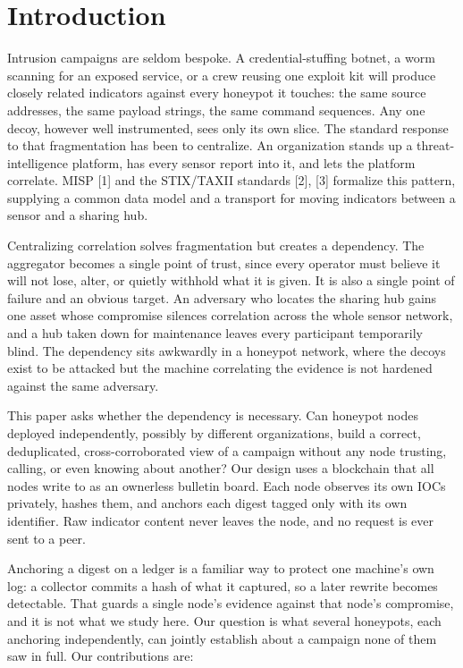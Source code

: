 \documentclass[conference]{IEEEtran}
\begin{document}
\section{Introduction}

Intrusion campaigns are seldom bespoke. A credential-stuffing botnet, a worm scanning for an exposed service, or a crew reusing one exploit kit will produce closely related indicators against every honeypot it touches: the same source addresses, the same payload strings, the same command sequences. Any one decoy, however well instrumented, sees only its own slice. The standard response to that fragmentation has been to centralize. An organization stands up a threat-intelligence platform, has every sensor report into it, and lets the platform correlate. MISP [1] and the STIX/TAXII standards [2], [3] formalize this pattern, supplying a common data model and a transport for moving indicators between a sensor and a sharing hub.

Centralizing correlation solves fragmentation but creates a dependency. The aggregator becomes a single point of trust, since every operator must believe it will not lose, alter, or quietly withhold what it is given. It is also a single point of failure and an obvious target. An adversary who locates the sharing hub gains one asset whose compromise silences correlation across the whole sensor network, and a hub taken down for maintenance leaves every participant temporarily blind. The dependency sits awkwardly in a honeypot network, where the decoys exist to be attacked but the machine correlating the evidence is not hardened against the same adversary.

This paper asks whether the dependency is necessary. Can honeypot nodes deployed independently, possibly by different organizations, build a correct, deduplicated, cross-corroborated view of a campaign without any node trusting, calling, or even knowing about another? Our design uses a blockchain that all nodes write to as an ownerless bulletin board. Each node observes its own IOCs privately, hashes them, and anchors each digest tagged only with its own identifier. Raw indicator content never leaves the node, and no request is ever sent to a peer.

Anchoring a digest on a ledger is a familiar way to protect one machine's own log: a collector commits a hash of what it captured, so a later rewrite becomes detectable. That guards a single node's evidence against that node's compromise, and it is not what we study here. Our question is what several honeypots, each anchoring independently, can jointly establish about a campaign none of them saw in full. Our contributions are:
\end{document}
